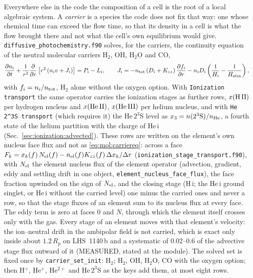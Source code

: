 Everywhere else in the code the composition of a cell is the root of a local
algebraic system. A \emph{carrier} is a species the code does not fix that
way: one whose chemical time can exceed the flow time, so that its density
in a cell is what the flow brought there and not what the cell's own
equilibrium would give. \texttt{diffusive\_photochemistry.f90} solves, for
the carriers, the continuity equation of the neutral molecular carriers
H$_2$, OH, H$_2$O and CO,
\begin{equation}
\frac{\partial n_i}{\partial t}
 + \frac{1}{r^{2}}\frac{\partial}{\partial r}
   \left[r^{2}\left(n_i v + J_i\right)\right] = P_i - L_i,
\qquad
J_i = -n_{\rm tot}\left(D_i+K_{zz}\right)\frac{\partial f_i}{\partial r}
         - n_i D_i\left(\frac{1}{H_i}-\frac{1}{H_{\rm atm}}\right),
\label{eq:mol:carriereq}
\end{equation}
with $f_i = n_i/n_{\rm tot}$, H$_2$ alone without the oxygen option. With
\texttt{Ionization transport} the same operator carries the ionization
stages as further rows, $x({\rm H\,II})$ per hydrogen nucleus and
$x({\rm He\,II})$, $x({\rm He\,III})$ per helium nucleus, and with
\texttt{He 2\^{}3S transport} (which requires it) the He\,$2^3$S level as
$x_3 = n(2^3{\rm S})/n_{\rm He}$, a fourth state of the helium partition
with the charge of He\,{\sc i} (Sec.~\ref{sec:ionization:advected}). These
rows are written on the element's own nucleus face flux and not as
\eqref{eq:mol:carriereq}: across a face
$F_k = x_k(f)\,N_{\rm el}(f) - n_{\rm el}(f)K_{zz}(f)\,\Delta x_k/\Delta r$
(\texttt{ionization\_stage\_transport.f90}), with $N_{\rm el}$ the
element nucleus flux of the element operator (advection, gradient, eddy and
settling drift in one object, \texttt{element\_nucleus\_face\_flux}), the
face fraction upwinded on the sign of $N_{\rm el}$, and the closing stage
(H\,{\sc i}; the He\,{\sc i} ground singlet, or He\,{\sc i} without the
carried level) one minus the carried ones and never a row, so that the stage
fluxes of an element sum to its nucleus flux at every face. The eddy term is
zero at faces 0 and $N$, through which the element itself crosses only with
the gas. Every stage of an element moves with that element's velocity: the
ion--neutral drift in the ambipolar field is not carried, which is exact only
inside about $1.2\,R_p$ on LHS~1140\,b and a systematic of 0.02--0.6 of the
advective stage flux outward of it (MEASURED, stated at the module). The
solved set is fixed once by \texttt{carrier\_set\_init}: H$_2$; H$_2$, OH,
H$_2$O, CO with the oxygen option; then H$^+$, He$^+$, He$^{2+}$ and
He\,$2^3$S as the keys add them, at most eight rows.

